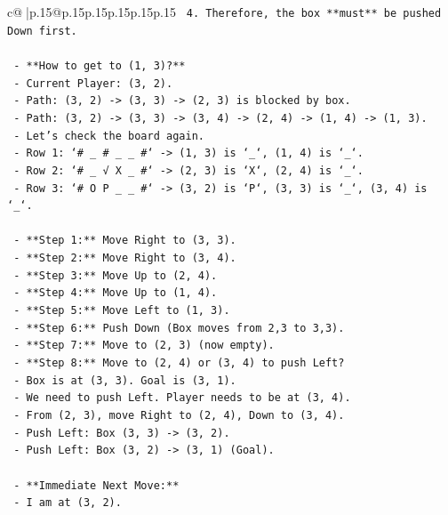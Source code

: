 \documentclass{article}
\begin{document}
{\begin{supertabular}{c@{$\;$}|p{.15\linewidth}@{}p{.15\linewidth}p{.15\linewidth}p{.15\linewidth}p{.15\linewidth}p{.15\linewidth}}
{{{\texttt{            4. Therefore, the box **must** be pushed Down first.} \\
\\ 
\texttt{    {-} **How to get to (1, 3)?**} \\
\texttt{        {-} Current Player: (3, 2).} \\
\texttt{        {-} Path: (3, 2) {-}> (3, 3) {-}> (2, 3) is blocked by box.} \\
\texttt{        {-} Path: (3, 2) {-}> (3, 3) {-}> (3, 4) {-}> (2, 4) {-}> (1, 4) {-}> (1, 3).} \\
\texttt{        {-} Let's check the board again.} \\
\texttt{        {-} Row 1: `\# \_ \# \_ \_ \#` {-}> (1, 3) is `\_`, (1, 4) is `\_`.} \\
\texttt{        {-} Row 2: `\# \_ √ X \_ \#` {-}> (2, 3) is `X`, (2, 4) is `\_`.} \\
\texttt{        {-} Row 3: `\# O P \_ \_ \#` {-}> (3, 2) is `P`, (3, 3) is `\_`, (3, 4) is `\_`.} \\
\\ 
\texttt{    {-} **Step 1:** Move Right to (3, 3).} \\
\texttt{    {-} **Step 2:** Move Right to (3, 4).} \\
\texttt{    {-} **Step 3:** Move Up to (2, 4).} \\
\texttt{    {-} **Step 4:** Move Up to (1, 4).} \\
\texttt{    {-} **Step 5:** Move Left to (1, 3).} \\
\texttt{    {-} **Step 6:** Push Down (Box moves from 2,3 to 3,3).} \\
\texttt{    {-} **Step 7:** Move to (2, 3) (now empty).} \\
\texttt{    {-} **Step 8:** Move to (2, 4) or (3, 4) to push Left?} \\
\texttt{        {-} Box is at (3, 3). Goal is (3, 1).} \\
\texttt{        {-} We need to push Left. Player needs to be at (3, 4).} \\
\texttt{        {-} From (2, 3), move Right to (2, 4), Down to (3, 4).} \\
\texttt{        {-} Push Left: Box (3, 3) {-}> (3, 2).} \\
\texttt{        {-} Push Left: Box (3, 2) {-}> (3, 1) (Goal).} \\
\\ 
\texttt{    {-} **Immediate Next Move:**} \\
\texttt{        {-} I am at (3, 2).} \\
}}}
\end{supertabular}}
\end{document}
